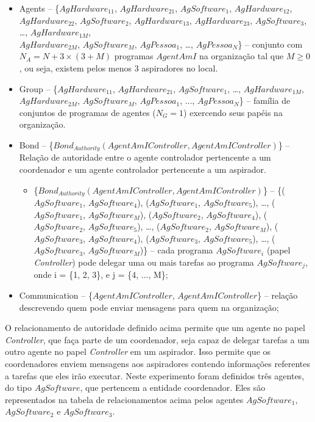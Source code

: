 \begin{itemize}
    \item Agents -- \{$AgHardware_{11}$, $AgHardware_{21}$, $AgSoftware_1$, $AgHardware_{12}$, $AgHardware_{22}$, $AgSoftware_2$, $AgHardware_{13}$, $AgHardware_{23}$, $AgSoftware_3$, \ldots, $AgHardware_{1M}$, \\$AgHardware_{2M}$, $AgSoftware_M$, $AgPessoa_1$, \ldots, $AgPessoa_N$\} – conjunto com $N_A = N + 3 \times (3 + M)$ programas $AgentAmI$ na organização tal que $M \geq 0$, ou seja, existem pelos menos 3 aspiradores no local.

    \item Group --	\{$AgHardware_{11}$, $AgHardware_{21}$, $AgSoftware_1$, \ldots, $AgHardware_{1M}$, $AgHardware_{2M}$, $AgSoftware_M$, $AgPessoa_1$, ..., $AgPessoa_N$\} – família de conjuntos de programas de agentes ($N_G = 1$) exercendo seus papéis na organização.
    
    \item Bond -- \{$Bond_{Authority}(AgentAmIController, AgentAmIController)$\} – Relação de autoridade entre o agente controlador pertencente a um coordenador e um agente controlador pertencente a um aspirador.
    
    \begin{itemize}
        \item \{$Bond_{Authority}(AgentAmIController, AgentAmIController)$\} – \{($AgSoftware_1$, $AgSoftware_4$), ($AgSoftware_1$, $AgSoftware_5$), \ldots, ($AgSoftware_1$, $AgSoftware_M$), ($AgSoftware_2$, $AgSoftware_4$), ($AgSoftware_2$, $AgSoftware_5$), \ldots, ($AgSoftware_2$, $AgSoftware_M$), ($AgSoftware_3$, $AgSoftware_4$), ($AgSoftware_3$, $AgSoftware_5$), \ldots, ($AgSoftware_3$, $AgSoftware_M$)\} – cada  programa $AgSoftware_i$ (papel \textit{Controller}) pode delegar uma ou mais tarefas ao programa $AgSoftware_j$, onde i = \{1, 2, 3\}, e j = \{4, ..., M\};
    \end{itemize}

    \item Communication	-- \{$AgentAmIController$, $AgentAmIController$\} – relação descrevendo quem pode enviar mensagens para quem na organização;

\end{itemize}

O relacionamento de autoridade definido acima permite que um agente no papel \textit{Controller}, que faça parte de um coordenador, seja capaz de delegar tarefas a um outro agente no papel \textit{Controller} em um aspirador. Isso permite que os coordenadores enviem mensagens aos aspiradores contendo informações referentes a tarefas que eles irão executar. Neste experimento foram definidos três agentes, do tipo $AgSoftware$, que pertencem a entidade coordenador. Eles são representados na tabela de relacionamentos acima pelos agentes $AgSoftware_1$, $AgSoftware_2$ e $AgSoftware_3$.

